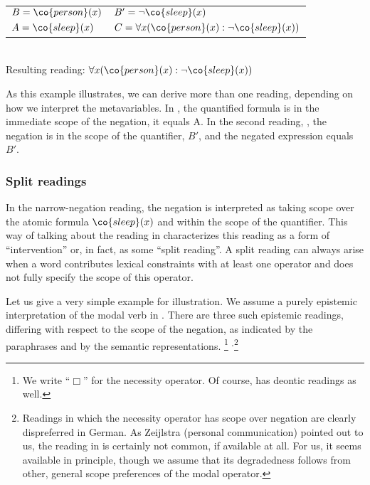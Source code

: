 \documentclass[output=paper]{langsci/langscibook}
\begin{document}
\ea \label{every-not-plug-narrow}
\begin{tabular}[t]{ll}
$B = \co{person}(x)$ & 
$B' = \lnot \co{sleep}(x)$\\
$A = \co{sleep}(x)$ & 
$C = \forall x (\co{person}(x): \lnot \co{sleep}(x))$
\end{tabular}\\
Resulting reading: $\forall x (\co{person}(x) : \lnot \co{sleep}(x))$
\z 

As this example illustrates, we can derive more than one reading, depending on how we interpret the metavariables. In , the quantified formula is in the immediate scope of the
negation, it equals A. In the second reading, , the negation is in
the scope of the quantifier, $B'$, and the negated expression equals $B'$.

\subsubsection{Split readings}
\label{Sec-LRS-Split}

In the narrow-negation reading, the negation is interpreted as taking scope over the atomic formula $\co{sleep}(x)$ and within the scope of the quantifier. This way of talking about the reading in  characterizes this reading as a form of ``intervention'' or, in fact, as some ``split reading''. 
 A split reading can always arise when a word contributes lexical constraints with at least 
 one operator and does not fully specify the scope of this operator.

 
 
 
 Let us give a very simple example for illustration. We assume a purely epistemic interpretation of the modal verb  in . There are three such epistemic readings, differing with respect to the scope of the negation, as indicated by the paraphrases and by the semantic representations.%
 \footnote{We write ``$\Box$'' for the necessity operator. Of course,  has deontic readings as well.}%
 $^,$\footnote{Readings in which the necessity operator has scope over negation are clearly dispreferred in German.
 As Zeijlstra (personal communication) pointed out to us, the reading in  is certainly not common, if available at all. 
 For us, it seems available in principle, though we assume that its degradedness follows from other, general scope preferences of the modal operator.
 }
 
\end{document}
